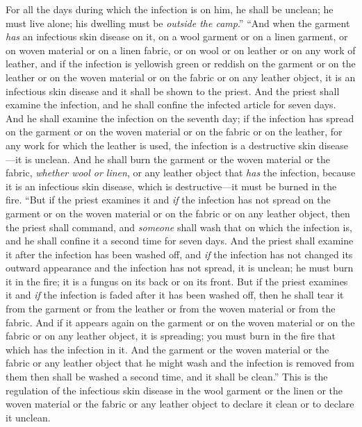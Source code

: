 \begin{biblechapter}
\verse For all the days during which the infection is on him, he shall be unclean; he must live alone; his dwelling must be \textit{outside the camp}.”
 “And when the garment \textit{has} an infectious skin disease on it, on a wool garment or on a linen garment,
\verse or on woven material or on a linen fabric, or on wool or on leather or on any work of leather,
\verse and if the infection is yellowish green or reddish on the garment or on the leather or on the woven material or on the fabric or on any leather object, it is an infectious skin disease and it shall be shown to the priest.
\verse And the priest shall examine the infection, and he shall confine the infected article for seven days.
\verse And he shall examine the infection on the seventh day; if the infection has spread on the garment or on the woven material or on the fabric or on the leather, for any work for which the leather is used, the infection is a destructive skin disease—it is unclean.
\verse And he shall burn the garment or the woven material or the fabric, \textit{whether wool or linen}, or any leather object that \textit{has} the infection, because it is an infectious skin disease, which is destructive—it must be burned in the fire.
\verse “But if the priest examines it and \textit{if} the infection has not spread on the garment or on the woven material or on the fabric or on any leather object,
\verse then the priest shall command, and \textit{someone} shall wash that on which the infection is, and he shall confine it a second time for seven days.
\verse And the priest shall examine it after the infection has been washed off, and \textit{if} the infection has not changed its outward appearance and the infection has not spread, it is unclean; he must burn it in the fire; it is a fungus on its back or on its front.
\verse But if the priest examines it and \textit{if} the infection is faded after it has been washed off, then he shall tear it from the garment or from the leather or from the woven material or from the fabric.
\verse And if it appears again on the garment or on the woven material or on the fabric or on any leather object, it is spreading; you must burn in the fire that which has the infection in it.
\verse And the garment or the woven material or the fabric or any leather object that he might wash and the infection is removed from them then shall be washed a second time, and it shall be clean.”
\verse This is the regulation of the infectious skin disease in the wool garment or the linen or the woven material or the fabric or any leather object to declare it clean or to declare it unclean.
\end{biblechapter}

